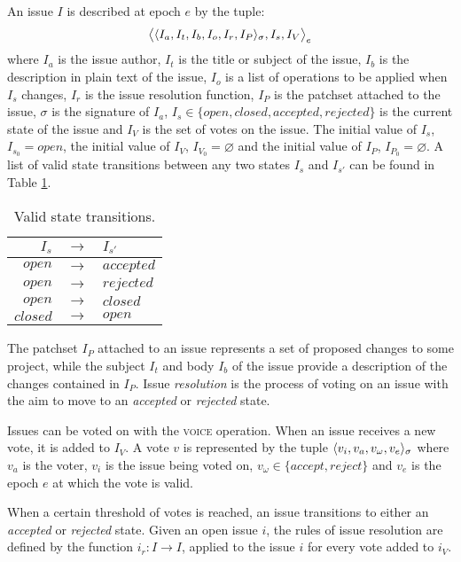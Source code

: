 
An issue $I$ is described at epoch $e$ by the tuple:
\[
    \big<\langle I_a, I_t, I_b, I_o, I_r, I_P \rangle_{\sigma}, I_s, I_V \big>_e
\]
where $I_a$ is the issue author, $I_t$ is the title or subject of the issue,
$I_b$ is the description in plain text of the issue, $I_o$ is a list of
operations to be applied when $I_s$ changes, $I_r$ is the issue resolution
function, $I_P$ is the patchset attached to the issue, $\sigma$ is the
signature of $I_a$, $I_s \in \{open, closed, accepted, rejected\}$ is the
current state of the issue and $I_V$ is the set of votes on the issue. The
initial value of $I_s$, $I_{s_0} = open$, the initial value of $I_V$, $I_{V_0}
= \varnothing$ and the initial value of $I_P$, $I_{P_0} = \varnothing$.  A list
of valid state transitions between any two states $I_s$ and $I_{s'}$ can be
found in Table \ref{issues-valid-transitions}.

\begin{table}[hbt]
    \caption{Valid state transitions.\label{issues-valid-transitions}}
    \begin{tabular}{rcl}
        \toprule
        $I_s$      & $\to$ & $I_{s'}$ \\
        \midrule
        $open$     & $\to$ & $accepted$ \\
        $open$     & $\to$ & $rejected$ \\
        $open$     & $\to$ & $closed$ \\
        $closed$   & $\to$ & $open$ \\
        \bottomrule
    \end{tabular}
\end{table}

The patchset $I_P$ attached to an issue represents a set of proposed changes to
some project, while the subject $I_t$ and body $I_b$ of the issue provide a
description of the changes contained in $I_P$. Issue \emph{resolution} is the
process of voting on an issue with the aim to move to an \emph{accepted} or
\emph{rejected} state.

Issues can be voted on with the \textsc{voice} operation. When an issue receives
a new vote, it is added to $I_V$. A vote $v$ is represented by the tuple
$\langle v_i, v_a, v_{\omega}, v_e \rangle_{\sigma}$ where $v_a$ is the voter,
$v_i$ is the issue being voted on, $v_{\omega} \in \{accept, reject\}$ and
$v_e$ is the epoch $e$ at which the vote is valid.

When a certain threshold of votes is reached, an issue transitions to either an
\emph{accepted} or \emph{rejected} state. Given an open issue $i$, the rules of
issue resolution are defined by the function $i_r : I \to I$, applied to the
issue $i$ for every vote added to $i_V$.

